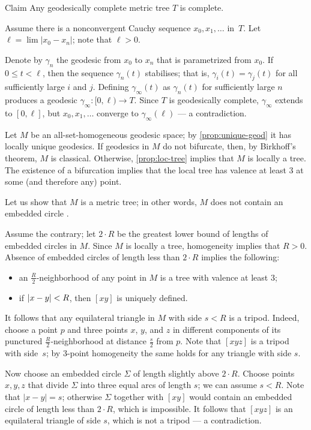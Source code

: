 \documentclass[leqno,a4paper,10pt]{article}
\begin{document}
\begin{thm}{Claim}\label{clm:complete}
Any geodesically complete metric tree $T$ is complete.
\end{thm}

Assume there is a nonconvergent Cauchy sequence $x_0,x_1,\ldots$ in~$T$.
Let $\ell=\lim |x_0-x_n|$;
note that $\ell>0$.

Denote by $\gamma_n$ the geodesic from $x_0$ to $x_n$ that is parametrized from $x_0$.
If $0\le t<\ell$, then the sequence $\gamma_n(t)$ stabilises;
that is, $\gamma_i(t)=\gamma_j(t)$ for all sufficiently large $i$ and $j$.
Defining $\gamma_\infty(t)$ as $\gamma_n(t)$ for sufficiently large $n$ produces a geodesic $\gamma_\infty \colon[0,\ell)\to T$.
Since $T$ is geodesically complete, $\gamma_\infty$ extends to $[0,\ell]$, but $x_0,x_1,\ldots$ converge to $\gamma_\infty(\ell)$ --- a contradiction.
\qeds

Let $M$ be an all-set-homogeneous geodesic space;
by \ref{prop:unique-geod} it has locally unique geodesics.
If geodesics in $M$ do not bifurcate, then, by Birkhoff's theorem, $M$ is classical.
Otherwise, \ref{prop:loc-tree} implies that $M$ is locally a tree.
The existence of a bifurcation implies that the local tree has valence at least $3$ at some (and therefore any) point.

Let us show that $M$ is a metric tree;
in other words, $M$ does not contain an embedded circle \cite[2.2.3]{chiswell}.

Assume the contrary; let $2\cdot R$ be the greatest lower bound of lengths of embedded circles in $M$.
Since $M$ is locally a tree, homogeneity implies that $R>0$.
Absence of embedded circles of length less than $2\cdot R$ implies the following:
\begin{itemize}
\item an $\tfrac R2$-neighborhood of any point in $M$ is a tree with valence at least $3$;
\item if $|x-y|\z<R$, then $[xy]$ is uniquely defined.
\end{itemize}

It follows that any equilateral triangle in $M$ with side $s<R$ is a tripod.
Indeed, choose a point $p$ and three points $x$, $y$, and $z$ in different components of its punctured $\tfrac R2$-neighborhood at distance $\tfrac s2$ from $p$.
Note that $[xyz]$ is a tripod with side~$s$;
by $3$-point homogeneity the same holds for any triangle with side $s$.

Now choose an embedded circle $\Sigma$ of length slightly above $2\cdot R$.
Choose points $x,y,z$ that divide $\Sigma$ into three equal arcs of length $s$;
we can assume  $s<R$.
Note that $|x-y|=s$; otherwise $\Sigma$ together with $[xy]$ would contain an embedded circle of length less than $2\cdot R$,
which is impossible.
It follows that $[xyz]$ is an equilateral triangle of side $s$,
which is not a tripod --- a contradiction.
\end{document}
